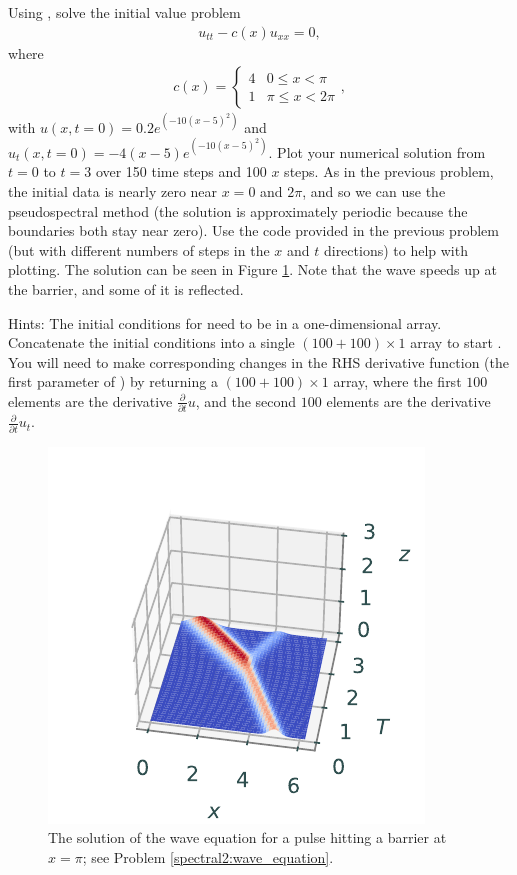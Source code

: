 \begin{problem}
Using , solve the initial value problem
\begin{align}
	u_{tt} -c(x) u_{xx} = 0,
\end{align}
where
\begin{align*}
c(x)=
\begin{cases}
  4  & 0\leq x < \pi \\
  1  & \pi \leq x < 2\pi
\end{cases},
\end{align*}
with $u(x,t=0) = 0.2e^{(-10(x-5)^2)}$  and $u_t(x,t=0) = -4(x-5)e^{(-10(x-5)^2)}$.
Plot your numerical solution from $t = 0$ to $t = 3$ over 150 time steps and 100 $x$ steps.
As in the previous problem, the initial data is nearly zero near $x = 0$ and $2 \pi$, and so we can use the pseudospectral method (the solution is approximately periodic because the boundaries both stay near zero).
Use the code provided in the previous problem (but with different numbers of steps in the $x$ and $t$ directions) to help with plotting. The solution can be seen in Figure \ref{fig:spectral:spectral2_wave}. Note that the wave speeds up at the barrier, and some of it is reflected.

Hints: The initial conditions for  need to be in a one-dimensional array. Concatenate the initial conditions into a single $(100+100)\times1$ array to start . You will need to make corresponding changes in the RHS derivative function (the first parameter of ) by returning a $(100+100)\times1$ array, where the first $100$ elements are the derivative $\frac{\partial}{\partial t}u$, and the second $100$ elements are the derivative $\frac{\partial}{\partial t}u_t$.
\label{spectral2:wave_equation}
\end{problem}

\begin{figure}[H]
\centering
\includegraphics[width=\textwidth]{figures/wave_equation_barrier.pdf}
\caption{The solution of the wave equation for a pulse hitting a barrier at $x=\pi$; see Problem \ref{spectral2:wave_equation}.}
\label{fig:spectral:spectral2_wave}
\end{figure}

